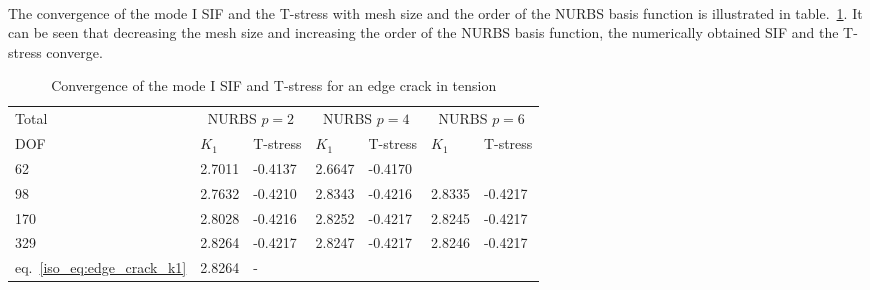\paragraph{}
The convergence of the mode \RN{1} SIF and the T-stress with mesh size and the order of the NURBS basis function is illustrated in table.~\ref{iso_tab:edge_crack_res}.
It can be seen that decreasing the mesh size and increasing the order of the NURBS basis function, the numerically obtained SIF and the T-stress converge.
\begin{table}
    \caption{Convergence of the mode \RN{1} SIF and T-stress for an edge crack in tension}
    \label{iso_tab:edge_crack_res}
    \begin{tabularx}{\textwidth}{XXXXXXX}
        \toprule
            Total    &   \multicolumn{2}{c}{NURBS $p=2$} &\multicolumn{2}{c}{NURBS $p=4$} &\multicolumn{2}{c}{NURBS $p=6$}\\
            \cmidrule{2-7}
            DOF      &   $K_1$   &   T-stress            &$K_1$   &   T-stress            &$K_1$   &   T-stress           \\
            \cmidrule{1-1} \cmidrule{2-3} \cmidrule{4-5} \cmidrule{6-7}
            62       &   2.7011  &   -0.4137             &2.6647  &-0.4170                &        &                      \\
            98       &   2.7632  &   -0.4210             &2.8343  &-0.4216                &2.8335  &-0.4217               \\
            170      &   2.8028  &   -0.4216             &2.8252  &-0.4217                &2.8245  &-0.4217               \\
            329      &   2.8264  &   -0.4217             &2.8247  &-0.4217                &2.8246  &-0.4217               \\
            eq.~\ref{iso_eq:edge_crack_k1} & 2.8264 & - & & & & \\
        \bottomrule
        \end{tabularx}
\end{table}

\pagebreak